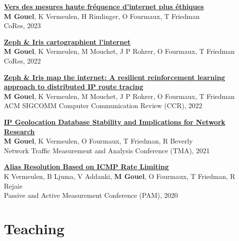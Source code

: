 \documentclass[11pt,a4paper,sans]{moderncv} %
\begin{document}
\vspace{0.25cm}
\href{https://hal.science/hal-04090683v1/document}{\textbf{Vers des mesures haute fréquence d'internet plus éthiques}}\\
\textbf{M Gouel}, K Vermeulen, H Rimlinger, O Fourmaux, T Friedman\\
CoRes, 2023

\vspace{0.25cm}
\href{https://hal.science/hal-03656974/document}{\textbf{Zeph \& Iris cartographient l’internet}}\\
\textbf{M Gouel}, K Vermeulen, M Mouchet, J P Rohrer, O Fourmaux, T Friedman\\
CoRes, 2022

\vspace{0.25cm}
\href{https://hal.science/hal-03597580/document}{\textbf{Zeph \& Iris map the internet: A resilient reinforcement learning approach to distributed IP route tracing}}\\
\textbf{M Gouel}, K Vermeulen, M Mouchet, J P Rohrer, O Fourmaux, T Friedman\\
ACM SIGCOMM Computer Communication Review (CCR), 2022

\vspace{0.25cm}
\href{https://dl.ifip.org/db/conf/tma/tma2021/tma2021-paper2.pdf}{\textbf{IP Geolocation Database Stability and Implications for Network Research}}\\
\textbf{M Gouel}, K Vermeulen, O Fourmaux, T Friedman, R Beverly\\
Network Traffic Measurement and Analysis Conference (TMA), 2021

\vspace{0.25cm}
\href{https://arxiv.org/pdf/2002.00252.pdf}{\textbf{Alias Resolution Based on ICMP Rate Limiting}} \\
K Vermeulen, B Ljuma, V Addanki, \textbf{M Gouel}, O Fourmaux, T Friedman, R Rejaie\\
Passive and Active Measurement Conference (PAM), 2020


\newpage
\section{Teaching}

\end{document}
